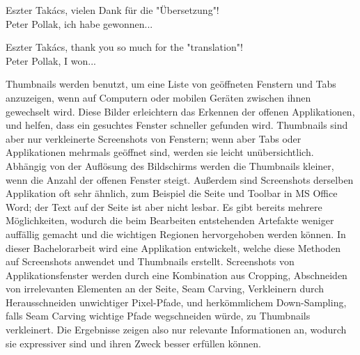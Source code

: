 \documentclass[draft,final]{vutinfth} %
\begin{document}
	
	\frontmatter %
	
	\addstatementpage
	
	\begin{danksagung*}
		Eszter Takács, vielen Dank für die "Übersetzung"! \\
		Peter Pollak, ich habe gewonnen...
	\end{danksagung*}
	
	\begin{acknowledgements*}
		Eszter Takács, thank you so much for the "translation"!\\
		Peter Pollak, I won...
	\end{acknowledgements*}
	
	\begin{kurzfassung} 
		Thumbnails werden benutzt, um eine Liste von geöffneten Fenstern und Tabs anzuzeigen, wenn auf Computern oder mobilen Geräten zwischen ihnen gewechselt wird.
		Diese Bilder erleichtern das Erkennen der offenen Applikationen, und helfen, dass ein gesuchtes Fenster schneller gefunden wird.
		Thumbnails sind aber nur verkleinerte Screenshots von Fenstern; wenn aber Tabs oder Applikationen mehrmals geöffnet sind, werden sie leicht unübersichtlich.
		Abhängig von der Auflösung des Bildschirms werden die Thumbnails kleiner, wenn die Anzahl der offenen Fenster steigt.
		Außerdem sind Screenshots derselben Applikation oft sehr ähnlich, zum Beispiel die Seite und Toolbar in MS Office Word; der Text auf der Seite ist aber nicht lesbar. 
		Es gibt bereits mehrere Möglichkeiten, wodurch die beim Bearbeiten entstehenden Artefakte weniger auffällig gemacht und die wichtigen Regionen hervorgehoben werden können.
		In dieser Bachelorarbeit wird eine Applikation entwickelt, welche diese Methoden auf Screenshots anwendet und Thumbnails erstellt.
		Screenshots von Applikationsfenster werden durch eine Kombination aus Cropping, Abschneiden von irrelevanten Elementen an der Seite, Seam Carving, Verkleinern durch Herausschneiden unwichtiger Pixel-Pfade, und herkömmlichem Down-Sampling, falls Seam Carving wichtige Pfade wegschneiden würde, zu Thumbnails verkleinert. 
		Die Ergebnisse zeigen also nur relevante Informationen an, wodurch sie expressiver sind und ihren Zweck besser erfüllen können.
		
	\end{kurzfassung}
	
\end{document}
